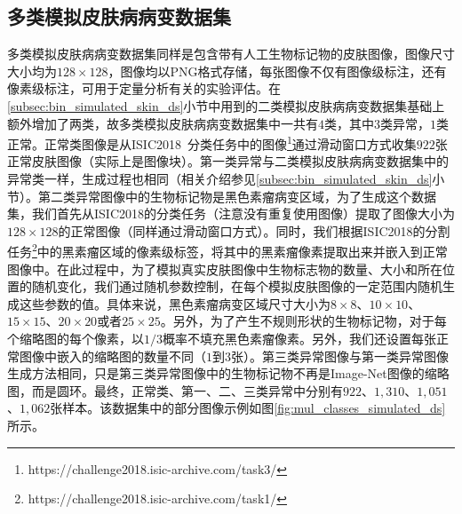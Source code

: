 \subsection{多类模拟皮肤病病变数据集}
多类模拟皮肤病病变数据集同样是包含带有人工生物标记物的皮肤图像，图像尺寸大小均为$128\times 128$，图像均以PNG格式存储，每张图像不仅有图像级标注，还有像素级标注，可用于定量分析有关的实验评估。在\ref{subsec:bin_simulated_skin_ds}小节中用到的二类模拟皮肤病病变数据集基础上额外增加了两类，故多类模拟皮肤病病变数据集中一共有$4$类，其中$3$类异常，$1$类正常。正常类图像是从ISIC2018~\cite{codella2019skin, tschandl2018ham10000}分类任务中的图像\footnote{https://challenge2018.isic-archive.com/task3/}通过滑动窗口方式收集$922$张正常皮肤图像（实际上是图像块）。第一类异常与二类模拟皮肤病病变数据集中的异常类一样，生成过程也相同（相关介绍参见\ref{subsec:bin_simulated_skin_ds}小节）。第二类异常图像中的生物标记物是黑色素瘤病变区域，为了生成这个数据集，我们首先从ISIC2018的分类任务（注意没有重复使用图像）提取了图像大小为$128\times 128$的正常图像（同样通过滑动窗口方式）。同时，我们根据ISIC2018的分割任务\footnote{https://challenge2018.isic-archive.com/task1/}中的黑素瘤区域的像素级标签，将其中的黑素瘤像素提取出来并嵌入到正常图像中。在此过程中，为了模拟真实皮肤图像中生物标志物的数量、大小和所在位置的随机变化，我们通过随机参数控制，在每个模拟皮肤图像的一定范围内随机生成这些参数的值。具体来说，黑色素瘤病变区域尺寸大小为$8\times 8$、$10\times 10$、$15\times 15$、$20\times 20$或者$25\times 25$。另外，为了产生不规则形状的生物标记物，对于每个缩略图的每个像素，以$1/3$概率不填充黑色素瘤像素。另外，我们还设置每张正常图像中嵌入的缩略图的数量不同（$1$到$3$张）。第三类异常图像与第一类异常图像生成方法相同，只是第三类异常图像中的生物标记物不再是Image-Net图像的缩略图，而是圆环。最终，正常类、第一、二、三类异常中分别有$922$、$1,310$、$1,051$、$1,062$张样本。该数据集中的部分图像示例如图\ref{fig:mul_classes_simulated_ds}所示。
